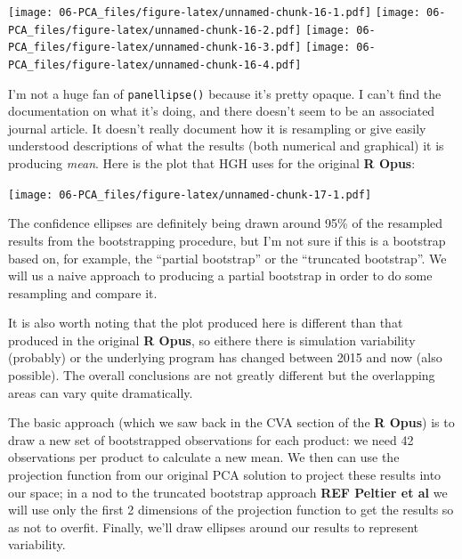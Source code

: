 \documentclass[
]{book}
\newenvironment{Shaded}{\begin{snugshade}}{\end{snugshade}}
\newcommand{\NormalTok}[1]{#1}
\newcommand{\SpecialCharTok}[1]{\textcolor[rgb]{0.81,0.36,0.00}{\textbf{#1}}}
\begin{document}
\texttt{[image: 06-PCA\_files/figure-latex/unnamed-chunk-16-1.pdf]} \texttt{[image: 06-PCA\_files/figure-latex/unnamed-chunk-16-2.pdf]} \texttt{[image: 06-PCA\_files/figure-latex/unnamed-chunk-16-3.pdf]} \texttt{[image: 06-PCA\_files/figure-latex/unnamed-chunk-16-4.pdf]}

I'm not a huge fan of \texttt{panellipse()} because it's pretty opaque. I can't find the documentation on what it's doing, and there doesn't seem to be an associated journal article. It doesn't really document how it is resampling or give easily understood descriptions of what the results (both numerical and graphical) it is producing \emph{mean}. Here is the plot that HGH uses for the original \textbf{R Opus}:

\begin{Shaded}
\end{Shaded}

\texttt{[image: 06-PCA\_files/figure-latex/unnamed-chunk-17-1.pdf]}

The confidence ellipses are definitely being drawn around 95\% of the resampled results from the bootstrapping procedure, but I'm not sure if this is a bootstrap based on, for example, the ``partial bootstrap'' or the ``truncated bootstrap''. We will us a naive approach to producing a partial bootstrap in order to do some resampling and compare it.

It is also worth noting that the plot produced here is different than that produced in the original \textbf{R Opus}, so eithere there is simulation variability (probably) or the underlying program has changed between 2015 and now (also possible). The overall conclusions are not greatly different but the overlapping areas can vary quite dramatically.

The basic approach (which we saw back in the CVA section of the \textbf{R Opus}) is to draw a new set of bootstrapped observations for each product: we need 42 observations per product to calculate a new mean. We then can use the projection function from our original PCA solution to project these results into our space; in a nod to the truncated bootstrap approach \textbf{REF Peltier et al} we will use only the first 2 dimensions of the projection function to get the results so as not to overfit. Finally, we'll draw ellipses around our results to represent variability.
\end{document}
